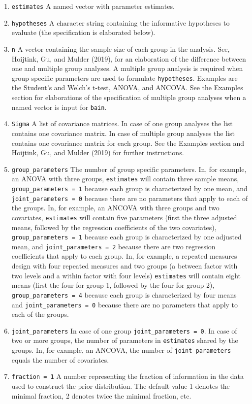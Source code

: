 \documentclass[
]{book}
\providecommand{\tightlist}{%
  \setlength{\itemsep}{0pt}\setlength{\parskip}{0pt}}
\begin{document}
\begin{enumerate}
\def\labelenumi{\alph{enumi})}
\tightlist
\item
  \texttt{estimates} A named vector with parameter estimates.
\item
  \texttt{hypotheses} A character string containing the informative
  hypotheses to evaluate (the specification is elaborated below).
\item
  \texttt{n} A vector containing the sample size of each group in the
  analysis. See, Hoijtink, Gu, and Mulder (2019), for an elaboration of the
  difference between one and multiple group analyses. A multiple group
  analysis is required when group specific parameters are used to formulate
  \texttt{hypotheses}. Examples are the Student's and Welch's t-test, ANOVA, and
  ANCOVA. See the Examples section for elaborations of the specification of
  multiple group analyses when a named vector is input for \texttt{bain}.
\item
  \texttt{Sigma} A list of covariance matrices. In case of one group
  analyses the list contains one covariance matrix. In case of multiple group
  analyses the list contains one covariance matrix for each group. See the
  Examples section and Hoijtink, Gu, and Mulder (2019) for further instructions.
\item
  \texttt{group\_parameters} The number of group specific parameters. In,
  for example, an ANOVA with three groups, \texttt{estimates} will contain three
  sample means, \texttt{group\_parameters\ =\ 1} because each group is characterized
  by one mean, and \texttt{joint\_parameters\ =\ 0} because there are no parameters
  that apply to each of the groups. In, for example, an ANCOVA with three
  groups and two covariates, \texttt{estimates} will contain five parameters
  (first the three adjusted means, followed by the regression coefficients
  of the two covariates),
  \texttt{group\_parameters\ =\ 1} because each group is characterized by one
  adjusted mean, and \texttt{joint\_parameters\ =\ 2} because there are two
  regression coefficients that apply to each group. In, for example, a repeated
  measures design with four repeated measures and two groups (a between factor
  with two levels and a within factor with four levels) \texttt{estimates} will
  contain eight means (first the four for group 1, followed by the four
  for group 2), \texttt{group\_parameters\ =\ 4}
  because each group is characterized by four means and \texttt{joint\_parameters\ =\ 0} because there are no parameters that apply to each of the groups.
\item
  \texttt{joint\_parameters} In case of one group \texttt{joint\_parameters\ =\ 0}. In case of two or more groups, the number of parameters in
  \texttt{estimates} shared by the groups. In, for example, an ANCOVA, the number
  of \texttt{joint\_parameters} equals the number of covariates.
\item
  \texttt{fraction\ =\ 1} A number representing the fraction of information in the data used to construct the prior distribution. The default value 1 denotes the minimal fraction, 2 denotes twice the minimal fraction, etc.
\end{enumerate}
\end{document}
